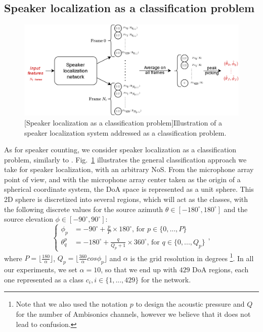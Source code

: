 \subsection{Speaker localization as a classification problem}
\label{ss:speakerLocalizationClassification}

\begin{figure}[t]
    \begin{center}
    \includegraphics[width=0.8\linewidth]{Images/chap6/multiLocalizationClassification.png}
    [Speaker localization as a classification problem]{Illustration of a speaker localization system addressed as a classification problem.}
    \label{fig:multiLocalizationClassification}
    \end{center}
\end{figure}

As for speaker counting, we consider speaker localization as a classification problem, similarly to \cite{perotin_crnn-based_2018}. Fig.~\ref{fig:multiLocalizationClassification} illustrates the general classification approach we take for speaker localization, with an arbitrary NoS. From the microphone array point of view, and with the microphone array center taken as the origin of a spherical coordinate system, the DoA space is represented as a unit sphere. This 2D sphere is discretized into several regions, which will act as the classes, with the following discrete values for the source azimuth $\theta \in [-180^{\circ},180^{\circ}]$ and the source elevation $\phi \in [-90^{\circ},90^{\circ}]$:
\begin{equation}
    \left\{ 
    \begin{aligned} 
      \phi_p   &= -90^{\circ} + \frac{p}{P} \times 180^{\circ} \text{, for } p \in \{0, ..., P\} \\
      \theta_q^p &= -180^{\circ} + \frac{q}{Q_p+1} \times 360^{\circ}  \text{, for } q \in \{0, ..., Q_p\}
    \end{aligned}
    \right. ,
\end{equation}
where $P = \lfloor \frac{180}{\alpha} \rfloor$, $Q_p = \lfloor \frac{360}{\alpha} cos \phi_p \rfloor$ and $\alpha$ is the grid resolution in degrees \footnote{Note that we also used the notation $p$ to design the acoustic pressure and $Q$ for the number of Ambisonics channels, however we believe that it does not lead to confusion.}. In all our experiments, we set $\alpha = 10$\textdegree, so that we end up with $429$ DoA regions, each one represented as a class $c_i, i \in \{1,...,429\}$ for the network.

